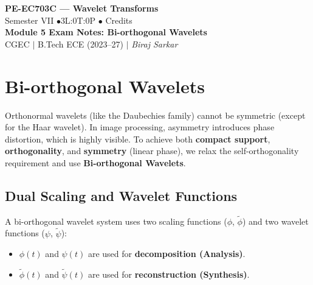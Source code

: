 \documentclass[12pt,a4paper]{article}
\begin{document}

\begin{center}
  {\LARGE\bfseries\color{myred} PE-EC703C --- Wavelet Transforms}\\[5pt]
  {\normalsize\color{mydark} Semester VII \quad$\bullet$\quad 3L:0T:0P \quad$\bullet$ Credits}\\[3pt]
  {\normalsize\color{myteal}\textbf{Module 5 Exam Notes: Bi-orthogonal Wavelets}}\\[3pt]
  {\small\color{mydark} CGEC \;$|$\; B.Tech ECE (2023--27) \;$|$\; \textit{Biraj Sarkar}}
\end{center}
\vspace{2pt}
\noindent{\color{myred}\rule{\linewidth}{1.5pt}}
\vspace{2pt}

\hypersetup{linkcolor=mydark}
\tableofcontents
\hypersetup{linkcolor=myteal}
\newpage

\section{Bi-orthogonal Wavelets}

Orthonormal wavelets (like the Daubechies family) cannot be symmetric (except for the Haar wavelet). In image processing, asymmetry introduces phase distortion, which is highly visible. To achieve both \textbf{compact support}, \textbf{orthogonality}, and \textbf{symmetry} (linear phase), we relax the self-orthogonality requirement and use \textbf{Bi-orthogonal Wavelets}.

\subsection{Dual Scaling and Wavelet Functions}
A bi-orthogonal wavelet system uses two scaling functions ($\phi$, $\tilde{\phi}$) and two wavelet functions ($\psi$, $\tilde{\psi}$):
\begin{itemize}[leftmargin=*, itemsep=3.5pt]
  \item $\phi(t)$ and $\psi(t)$ are used for \textbf{decomposition (Analysis)}.
  \item $\tilde{\phi}(t)$ and $\tilde{\psi}(t)$ are used for \textbf{reconstruction (Synthesis)}.
\end{itemize}
\end{document}
